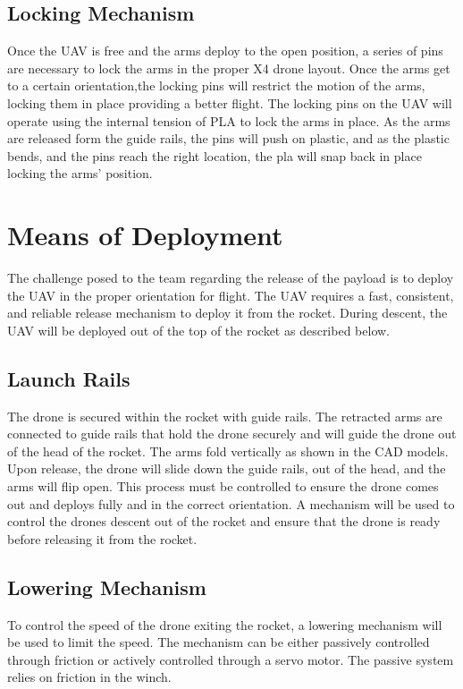 	\subsection{Locking Mechanism}
		Once the UAV is free and the arms deploy to the open position, a series of pins are necessary to lock the arms in the proper X4 drone layout.  Once the arms get to a certain orientation,the locking pins will restrict the motion of the arms, locking them in place providing a better flight.  The locking pins on the UAV will operate using the internal tension of PLA to lock the arms in place.  As the arms are released form the guide rails, the pins will push on plastic, and as the plastic bends, and the pins reach the right location, the pla will snap back in place locking the arms’ position. 



\section{Means of Deployment}\label{PL:Tradeoffs:Deployment}
	The challenge posed to the team regarding the release of the payload is to deploy the UAV in the proper orientation for flight. The UAV requires a fast, consistent, and reliable release mechanism to deploy it from the rocket. During descent, the UAV will be deployed out of the top of the rocket as described below. 

	\subsection{Launch Rails}
		The drone is secured within the rocket with guide rails. The retracted arms are connected to guide rails that hold the drone securely and will guide the drone out of the head of the rocket. The arms fold vertically as shown in the CAD models. Upon release, the drone will slide down the guide rails, out of the head, and the arms will flip open. This process must be controlled to ensure the drone comes out and deploys fully and in the correct orientation. A mechanism will be used to control the drones descent out of the rocket and ensure that the drone is ready before releasing it from the rocket.

	\subsection{Lowering Mechanism}
		To control the speed of the drone exiting the rocket, a lowering mechanism will be used to limit the speed. The mechanism can be either passively controlled through friction or actively controlled through a servo motor. The passive system relies on friction in the winch. 

